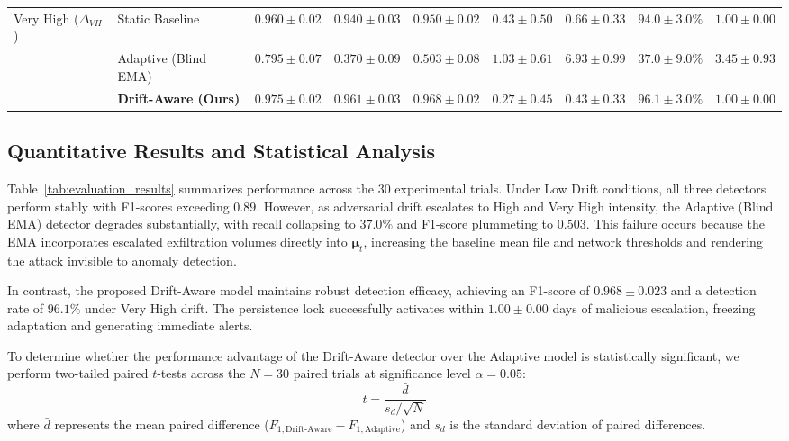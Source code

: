 \documentclass[conference]{IEEEtran}
\begin{document}
\begin{table}[t]
\begin{center}
{\begin{tabular}{llccccccc}
\midrule
Very High ($\Delta_{VH}$) & Static Baseline & $0.960 \pm 0.02$ & $0.940 \pm 0.03$ & $0.950 \pm 0.02$ & $0.43 \pm 0.50$ & $0.66 \pm 0.33$ & $94.0 \pm 3.0\%$ & $1.00 \pm 0.00$ \\
                       & Adaptive (Blind EMA) & $0.795 \pm 0.07$ & $0.370 \pm 0.09$ & $0.503 \pm 0.08$ & $1.03 \pm 0.61$ & $6.93 \pm 0.99$ & $37.0 \pm 9.0\%$ & $3.45 \pm 0.93$ \\
                       & \textbf{Drift-Aware (Ours)} & $\mathbf{0.975 \pm 0.02}$ & $\mathbf{0.961 \pm 0.03}$ & $\mathbf{0.968 \pm 0.02}$ & $\mathbf{0.27 \pm 0.45}$ & $\mathbf{0.43 \pm 0.33}$ & $\mathbf{96.1 \pm 3.0\%}$ & $\mathbf{1.00 \pm 0.00}$ \\
\bottomrule
\end{tabular}%
}
\end{center}
\end{table}

\subsection{Quantitative Results and Statistical Analysis}
Table~\ref{tab:evaluation_results} summarizes performance across the 30 experimental trials. Under Low Drift conditions, all three detectors perform stably with F1-scores exceeding $0.89$. However, as adversarial drift escalates to High and Very High intensity, the Adaptive (Blind EMA) detector degrades substantially, with recall collapsing to $37.0\%$ and F1-score plummeting to $0.503$. This failure occurs because the EMA incorporates escalated exfiltration volumes directly into $\boldsymbol{\mu}_t$, increasing the baseline mean file and network thresholds and rendering the attack invisible to anomaly detection.

In contrast, the proposed Drift-Aware model maintains robust detection efficacy, achieving an F1-score of $0.968 \pm 0.023$ and a detection rate of $96.1\%$ under Very High drift. The persistence lock successfully activates within $1.00 \pm 0.00$ days of malicious escalation, freezing adaptation and generating immediate alerts.

To determine whether the performance advantage of the Drift-Aware detector over the Adaptive model is statistically significant, we perform two-tailed paired $t$-tests across the $N = 30$ paired trials at significance level $\alpha = 0.05$:
\begin{equation}
t = \frac{\bar{d}}{s_d / \sqrt{N}}
\end{equation}
where $\bar{d}$ represents the mean paired difference ($F_{1, \text{Drift-Aware}} - F_{1, \text{Adaptive}}$) and $s_d$ is the standard deviation of paired differences.
\end{document}
